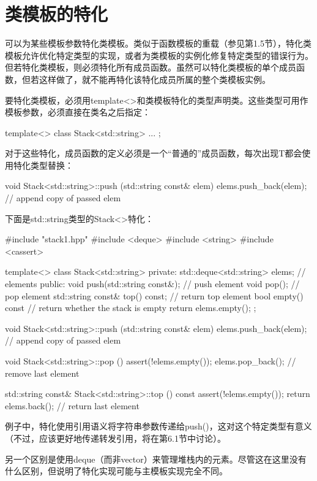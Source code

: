 \section{类模板的特化}

可以为某些模板参数特化类模板。类似于函数模板的重载（参见第1.5节），特化类模板允许优化特定类型的实现，或者为类模板的实例化修复特定类型的错误行为。但若特化类模板，则必须特化所有成员函数。虽然可以特化类模板的单个成员函数，但若这样做了，就不能再特化该特化成员所属的整个类模板实例。

要特化类模板，必须用template<>和类模板特化的类型声明类。这些类型可用作模板参数，必须直接在类名之后指定：

\begin{cpp}
template<>
class Stack<std::string> {
	...
};
\end{cpp}

对于这些特化，成员函数的定义必须是一个“普通的”成员函数，每次出现T都会使用特化类型替换：

\begin{cpp}
void Stack<std::string>::push (std::string const& elem) {
	elems.push_back(elem); // append copy of passed elem
}
\end{cpp}

下面是std::string类型的Stack<>特化：

\begin{cpp}
#include "stack1.hpp"
#include <deque>
#include <string>
#include <cassert>

template<>
class Stack<std::string> {
	private:
	std::deque<std::string> elems; // elements
	public:
	void push(std::string const&); // push element
	void pop(); // pop element
	std::string const& top() const; // return top element
	bool empty() const { // return whether the stack is empty
		return elems.empty();
	}
};

void Stack<std::string>::push (std::string const& elem) {
	elems.push_back(elem); // append copy of passed elem
}

void Stack<std::string>::pop () {
	assert(!elems.empty());
	elems.pop_back(); // remove last element
}

std::string const& Stack<std::string>::top () const {
	assert(!elems.empty());
	return elems.back(); // return last element
}
\end{cpp}

例子中，特化使用引用语义将字符串参数传递给push()，这对这个特定类型有意义（不过，应该更好地传递转发引用，将在第6.1节中讨论）。

另一个区别是使用deque（而非vector）来管理堆栈内的元素。尽管这在这里没有什么区别，但说明了特化实现可能与主模板实现完全不同。





















